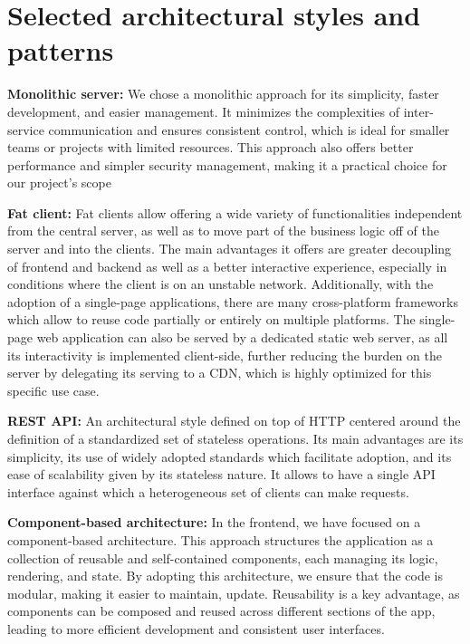 \begin{itemize}
\newpage

\end{itemize}


\section{Selected architectural styles and patterns}
\textbf{Monolithic server:} 
We chose a monolithic approach for its simplicity, faster development, and easier management. It minimizes the complexities of inter-service communication and ensures consistent control, which is ideal for smaller teams or projects with limited resources. This approach also offers better performance and simpler security management, making it a practical choice for our project’s scope

\textbf{Fat client:}
Fat clients allow offering a wide variety of functionalities independent from the central server, as well as to move part of the business logic off of the server and into the clients. The main advantages it offers are greater decoupling of frontend and backend as well as a better interactive experience, especially in conditions where the client is on an unstable network. Additionally, with the adoption of a single-page applications, there are many cross-platform frameworks which allow to reuse code partially or entirely on multiple platforms. The single-page web application can also be served by a dedicated static web server, as all its interactivity is implemented client-side, further reducing the burden on the server by delegating its serving to a CDN, which is highly optimized for
this specific use case.

\textbf{REST API:}
An architectural style defined on top of HTTP centered around the definition of a standardized set of stateless operations. Its main advantages are its simplicity, its use of widely adopted standards which facilitate adoption, and its ease of scalability given by its stateless nature. It allows to have a single API interface against which a heterogeneous set of clients can make requests.

\textbf{Component-based architecture:}
In the frontend, we have focused on a component-based architecture. This approach structures the application as a collection of reusable and self-contained components, each managing its logic, rendering, and state. By adopting this architecture, we ensure that the code is modular, making it easier to maintain, update. Reusability is a key advantage, as components can be composed and reused across different sections of the app, leading to more efficient development and consistent user interfaces.


